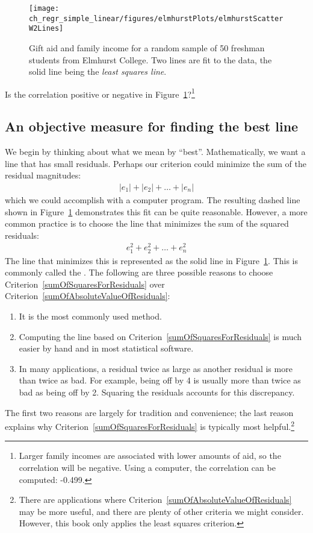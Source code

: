 \begin{figure}[h]
\centering
\texttt{[image: ch\_regr\_simple\_linear/figures/elmhurstPlots/elmhurstScatterW2Lines]}
\caption{Gift aid and family income for a random sample of 50 freshman students from Elmhurst College. Two lines are fit to the data, the solid line being the \emph{least squares line}.}
\label{elmhurstScatterW2Lines}
\end{figure}

\begin{exercise}
Is the correlation positive or negative in Figure~\ref{elmhurstScatterW2Lines}?\footnote{Larger family incomes are associated with lower amounts of aid, so the correlation will be negative. Using a computer, the correlation can be computed: -0.499.}
\end{exercise}

\subsection{An objective measure for finding the best line}

We begin by thinking about what we mean by ``best''. Mathematically, we want a line that has small residuals. Perhaps our criterion could minimize the sum of the residual magnitudes:
\begin{eqnarray}
|e_1| + |e_2| + \dots + |e_n|
\label{sumOfAbsoluteValueOfResiduals}
\end{eqnarray}
which we could accomplish with a computer program. The resulting dashed line shown in Figure~\ref{elmhurstScatterW2Lines} demonstrates this fit can be quite reasonable. However, a more common practice is to choose the line that minimizes the sum of the squared residuals:
\begin{eqnarray}
e_{1}^2 + e_{2}^2 + \dots + e_{n}^2
\label{sumOfSquaresForResiduals}
\end{eqnarray}
The line that minimizes this  is represented as the solid line in Figure~\ref{elmhurstScatterW2Lines}. This is commonly called the . The following are three possible reasons to choose Criterion~\eqref{sumOfSquaresForResiduals} over Criterion~\eqref{sumOfAbsoluteValueOfResiduals}:
\begin{enumerate}
\item It is the most commonly used method.
\item Computing the line based on Criterion~\eqref{sumOfSquaresForResiduals} is much easier by hand and in most statistical software.
\item In many applications, a residual twice as large as another residual is more than twice as bad. For example, being off by 4 is usually more than twice as bad as being off by 2. Squaring the residuals accounts for this discrepancy.
\end{enumerate}
The first two reasons are largely for tradition and convenience; the last reason explains why Criterion~\eqref{sumOfSquaresForResiduals} is typically most helpful.\footnote{There are applications where Criterion~\eqref{sumOfAbsoluteValueOfResiduals} may be more useful, and there are plenty of other criteria we might consider. However, this book only applies the least squares criterion.}

